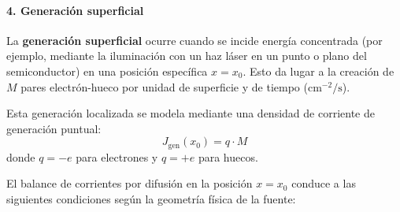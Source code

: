\paragraph{4. Generación superficial}
La \textbf{generación superficial} ocurre cuando se incide energía concentrada (por ejemplo, mediante la iluminación con un haz láser en un punto o plano del semiconductor) en una posición específica $x = x_0$. Esto da lugar a la creación de $M$ pares electrón-hueco por unidad de superficie y de tiempo ($\si{\cm^{-2}\per\second}$).

Esta generación localizada se modela mediante una densidad de corriente de generación puntual:
\[
J_{\text{gen}}(x_0) = q \cdot M
\]
donde $q = -e$ para electrones y $q = +e$ para huecos.

El balance de corrientes por difusión en la posición $x = x_0$ conduce a las siguientes condiciones según la geometría física de la fuente:

